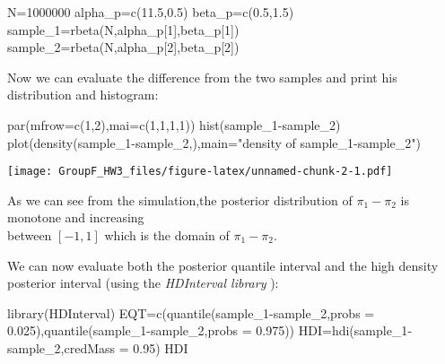 \documentclass[
]{article}
\newenvironment{Shaded}{\begin{snugshade}}{\end{snugshade}}
\newcommand{\AttributeTok}[1]{\textcolor[rgb]{0.77,0.63,0.00}{#1}}
\newcommand{\DecValTok}[1]{\textcolor[rgb]{0.00,0.00,0.81}{#1}}
\newcommand{\FloatTok}[1]{\textcolor[rgb]{0.00,0.00,0.81}{#1}}
\newcommand{\FunctionTok}[1]{\textcolor[rgb]{0.00,0.00,0.00}{#1}}
\newcommand{\NormalTok}[1]{#1}
\newcommand{\OtherTok}[1]{\textcolor[rgb]{0.56,0.35,0.01}{#1}}
\newcommand{\SpecialCharTok}[1]{\textcolor[rgb]{0.00,0.00,0.00}{#1}}
\newcommand{\StringTok}[1]{\textcolor[rgb]{0.31,0.60,0.02}{#1}}
\begin{document}
\begin{Shaded}
\begin{Highlighting}[]
\NormalTok{N}\OtherTok{=}\DecValTok{1000000}
\NormalTok{alpha\_p}\OtherTok{=}\FunctionTok{c}\NormalTok{(}\FloatTok{11.5}\NormalTok{,}\FloatTok{0.5}\NormalTok{)}
\NormalTok{beta\_p}\OtherTok{=}\FunctionTok{c}\NormalTok{(}\FloatTok{0.5}\NormalTok{,}\FloatTok{1.5}\NormalTok{)}
\NormalTok{sample\_1}\OtherTok{=}\FunctionTok{rbeta}\NormalTok{(N,alpha\_p[}\DecValTok{1}\NormalTok{],beta\_p[}\DecValTok{1}\NormalTok{])}
\NormalTok{sample\_2}\OtherTok{=}\FunctionTok{rbeta}\NormalTok{(N,alpha\_p[}\DecValTok{2}\NormalTok{],beta\_p[}\DecValTok{2}\NormalTok{])}
\end{Highlighting}
\end{Shaded}

Now we can evaluate the difference from the two samples and print his
distribution and histogram:

\begin{Shaded}
\begin{Highlighting}[]
\FunctionTok{par}\NormalTok{(}\AttributeTok{mfrow=}\FunctionTok{c}\NormalTok{(}\DecValTok{1}\NormalTok{,}\DecValTok{2}\NormalTok{),}\AttributeTok{mai=}\FunctionTok{c}\NormalTok{(}\DecValTok{1}\NormalTok{,}\DecValTok{1}\NormalTok{,}\DecValTok{1}\NormalTok{,}\DecValTok{1}\NormalTok{))}
\FunctionTok{hist}\NormalTok{(sample\_1}\SpecialCharTok{{-}}\NormalTok{sample\_2)}
\FunctionTok{plot}\NormalTok{(}\FunctionTok{density}\NormalTok{(sample\_1}\SpecialCharTok{{-}}\NormalTok{sample\_2,),}\AttributeTok{main=}\StringTok{"density of sample\_1{-}sample\_2"}\NormalTok{)}
\end{Highlighting}
\end{Shaded}

\texttt{[image: GroupF\_HW3\_files/figure-latex/unnamed-chunk-2-1.pdf]}

As we can see from the simulation,the posterior distribution of
\(\pi_1-\pi_2\) is monotone and increasing\\
between \([-1,1]\) which is the domain of \(\pi_1-\pi_2\).

We can now evaluate both the posterior quantile interval and the high
density posterior interval (using the \emph{HDInterval library} ):

\begin{Shaded}
\begin{Highlighting}[]
\FunctionTok{library}\NormalTok{(HDInterval)}
\NormalTok{EQT}\OtherTok{=}\FunctionTok{c}\NormalTok{(}\FunctionTok{quantile}\NormalTok{(sample\_1}\SpecialCharTok{{-}}\NormalTok{sample\_2,}\AttributeTok{probs =} \FloatTok{0.025}\NormalTok{),}\FunctionTok{quantile}\NormalTok{(sample\_1}\SpecialCharTok{{-}}\NormalTok{sample\_2,}\AttributeTok{probs =} \FloatTok{0.975}\NormalTok{))}
\NormalTok{HDI}\OtherTok{=}\FunctionTok{hdi}\NormalTok{(sample\_1}\SpecialCharTok{{-}}\NormalTok{sample\_2,}\AttributeTok{credMass =} \FloatTok{0.95}\NormalTok{)}
\NormalTok{HDI}
\end{Highlighting}
\end{Shaded}
\end{document}
